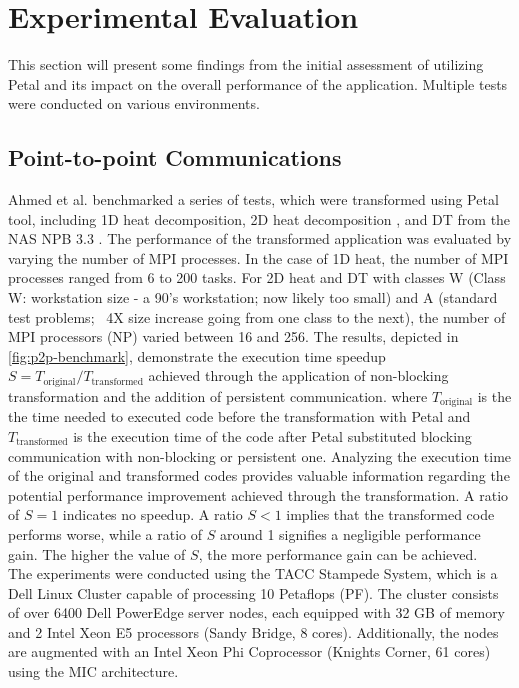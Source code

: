 \section{Experimental Evaluation}
This section will present some findings from the initial assessment of utilizing Petal and its impact on the overall performance of the application. Multiple tests were conducted on various environments.
\subsection{Point-to-point Communications}

Ahmed et al. \cite{hoefler_case_2007} benchmarked a series of tests, which were transformed using Petal tool, including 1D heat decomposition, 2D heat decomposition  \cite{ahmed_petal_2016}, and DT from the NAS NPB 3.3 \cite{noauthor_nas_nodate}. 
The performance of the transformed application was evaluated by varying the number of MPI processes. In the case of 1D heat, the number of MPI processes ranged from 6 to 200 tasks. 
For 2D heat and DT with classes W (Class W: workstation size - a 90's workstation; now likely too small) and A (standard test problems; ~4X size increase going from one class to the next), the number of MPI processors (NP) varied between 16 and 256. 
The results, depicted in \autoref{fig:p2p-benchmark}, demonstrate the execution time speedup 
$S = T_{\text{original}}/T_{\text{transformed}}$ achieved through the application of non-blocking transformation and the addition of persistent communication.
where $T_{\text{original}}$ is the the time needed to executed code before the transformation with Petal and $T_{\text{transformed}}$ is the execution time of the code after Petal substituted blocking communication with non-blocking or persistent one.
Analyzing the execution time of the original and transformed codes provides valuable information regarding the potential performance improvement achieved through the transformation. A ratio of $S = 1$ indicates no speedup. A ratio $S < 1$ implies that the transformed code performs worse, while a ratio of $S$ around 1 signifies a negligible performance gain.
The higher the value of $S$, the more performance gain can be achieved.\\

The experiments were conducted using the TACC Stampede System, which is a Dell Linux Cluster capable of processing 10 Petaflops (PF). 
The cluster consists of over 6400 Dell PowerEdge server nodes, each equipped with 32 GB of memory and 2 Intel Xeon E5 processors (Sandy Bridge, 8 cores). 
Additionally, the nodes are augmented with an Intel Xeon Phi Coprocessor (Knights Corner, 61 cores) using the MIC architecture.


